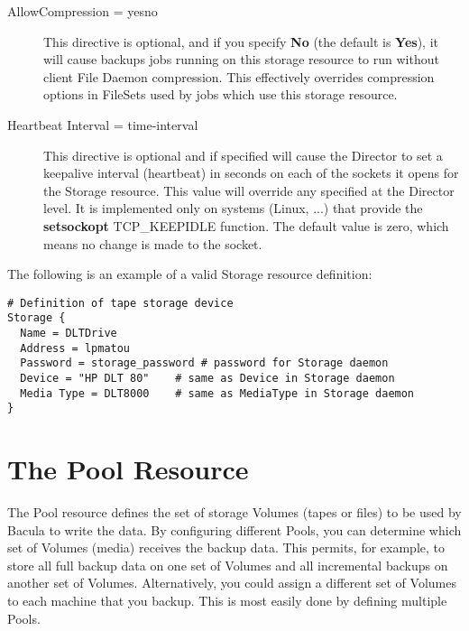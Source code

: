 \begin{description}
\item [AllowCompression = \lt{}yes\vb{}no\gt{}]
  \label{AllowCompression}

   This directive is optional, and if you specify {\bf No} (the default is {\bf
     Yes}), it will cause backups jobs running on this storage resource to run
   without client File Daemon compression.  This effectively overrides
   compression options in FileSets used by jobs which use this storage
   resource.

\item [Heartbeat Interval = \lt{}time-interval\gt{}]
   This directive is optional and if specified will cause the Director to
   set a keepalive interval (heartbeat) in seconds on each of the sockets
   it opens for the Storage resource.  This value will override any
   specified at the Director level.  It is implemented only on systems
   (Linux, ...) that provide the {\bf setsockopt} TCP\_KEEPIDLE function.
   The default value is zero, which means no change is made to the socket.

\end{description}

The following is an example of a valid Storage resource definition: 

\footnotesize
\begin{verbatim}
# Definition of tape storage device
Storage {
  Name = DLTDrive
  Address = lpmatou
  Password = storage_password # password for Storage daemon
  Device = "HP DLT 80"    # same as Device in Storage daemon
  Media Type = DLT8000    # same as MediaType in Storage daemon
}
\end{verbatim}
\normalsize

\section{The Pool Resource}
\label{PoolResource}

The Pool resource defines the set of storage Volumes (tapes or files) to be
used by Bacula to write the data. By configuring different Pools, you can
determine which set of Volumes (media) receives the backup data. This permits,
for example, to store all full backup data on one set of Volumes and all
incremental backups on another set of Volumes. Alternatively, you could assign
a different set of Volumes to each machine that you backup. This is most
easily done by defining multiple Pools. 


